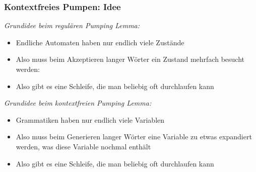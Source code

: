 \documentclass[onlymath]{beamer}
\begin{document}
\begin{frame}\frametitle{Kontextfreies Pumpen: Idee}

\emph{Grundidee beim regulären Pumping Lemma:}
\begin{itemize}
\item Endliche Automaten haben nur endlich viele Zustände
\item Also muss beim Akzeptieren langer Wörter ein Zustand mehrfach besucht werden:\\
\item Also gibt es eine Schleife, die man beliebig oft durchlaufen kann
\end{itemize}
\bigskip\pause

\emph{Grundidee beim kontextfreien Pumping Lemma:}
\begin{itemize}
\item Grammatiken haben nur endlich viele Variablen
\item Also muss beim Generieren langer Wörter eine Variable zu etwas expandiert werden, was diese Variable nochmal enthält\ghost{:}\\
\item Also gibt es eine Schleife, die man beliebig oft durchlaufen kann
\end{itemize}

\end{frame}
\end{document}
